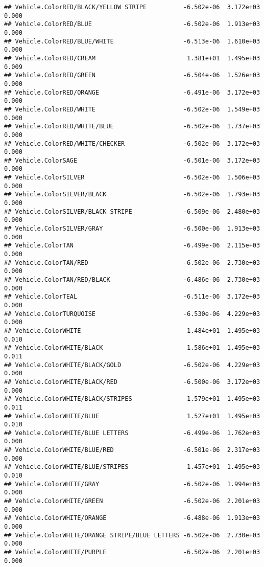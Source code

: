 \documentclass[
]{article}
\begin{document}
\begin{verbatim}
## Vehicle.ColorRED/BLACK/YELLOW STRIPE          -6.502e-06  3.172e+03   0.000
## Vehicle.ColorRED/BLUE                         -6.502e-06  1.913e+03   0.000
## Vehicle.ColorRED/BLUE/WHITE                   -6.513e-06  1.610e+03   0.000
## Vehicle.ColorRED/CREAM                         1.381e+01  1.495e+03   0.009
## Vehicle.ColorRED/GREEN                        -6.504e-06  1.526e+03   0.000
## Vehicle.ColorRED/ORANGE                       -6.491e-06  3.172e+03   0.000
## Vehicle.ColorRED/WHITE                        -6.502e-06  1.549e+03   0.000
## Vehicle.ColorRED/WHITE/BLUE                   -6.502e-06  1.737e+03   0.000
## Vehicle.ColorRED/WHITE/CHECKER                -6.502e-06  3.172e+03   0.000
## Vehicle.ColorSAGE                             -6.501e-06  3.172e+03   0.000
## Vehicle.ColorSILVER                           -6.502e-06  1.506e+03   0.000
## Vehicle.ColorSILVER/BLACK                     -6.502e-06  1.793e+03   0.000
## Vehicle.ColorSILVER/BLACK STRIPE              -6.509e-06  2.480e+03   0.000
## Vehicle.ColorSILVER/GRAY                      -6.500e-06  1.913e+03   0.000
## Vehicle.ColorTAN                              -6.499e-06  2.115e+03   0.000
## Vehicle.ColorTAN/RED                          -6.502e-06  2.730e+03   0.000
## Vehicle.ColorTAN/RED/BLACK                    -6.486e-06  2.730e+03   0.000
## Vehicle.ColorTEAL                             -6.511e-06  3.172e+03   0.000
## Vehicle.ColorTURQUOISE                        -6.530e-06  4.229e+03   0.000
## Vehicle.ColorWHITE                             1.484e+01  1.495e+03   0.010
## Vehicle.ColorWHITE/BLACK                       1.586e+01  1.495e+03   0.011
## Vehicle.ColorWHITE/BLACK/GOLD                 -6.502e-06  4.229e+03   0.000
## Vehicle.ColorWHITE/BLACK/RED                  -6.500e-06  3.172e+03   0.000
## Vehicle.ColorWHITE/BLACK/STRIPES               1.579e+01  1.495e+03   0.011
## Vehicle.ColorWHITE/BLUE                        1.527e+01  1.495e+03   0.010
## Vehicle.ColorWHITE/BLUE LETTERS               -6.499e-06  1.762e+03   0.000
## Vehicle.ColorWHITE/BLUE/RED                   -6.501e-06  2.317e+03   0.000
## Vehicle.ColorWHITE/BLUE/STRIPES                1.457e+01  1.495e+03   0.010
## Vehicle.ColorWHITE/GRAY                       -6.502e-06  1.994e+03   0.000
## Vehicle.ColorWHITE/GREEN                      -6.502e-06  2.201e+03   0.000
## Vehicle.ColorWHITE/ORANGE                     -6.488e-06  1.913e+03   0.000
## Vehicle.ColorWHITE/ORANGE STRIPE/BLUE LETTERS -6.502e-06  2.730e+03   0.000
## Vehicle.ColorWHITE/PURPLE                     -6.502e-06  2.201e+03   0.000

\end{verbatim}
\end{document}
